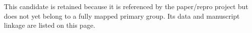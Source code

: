 This candidate is retained because it is referenced by the paper/repro project but does not yet belong to a fully mapped primary group. Its data and manuscript linkage are listed on this page.
